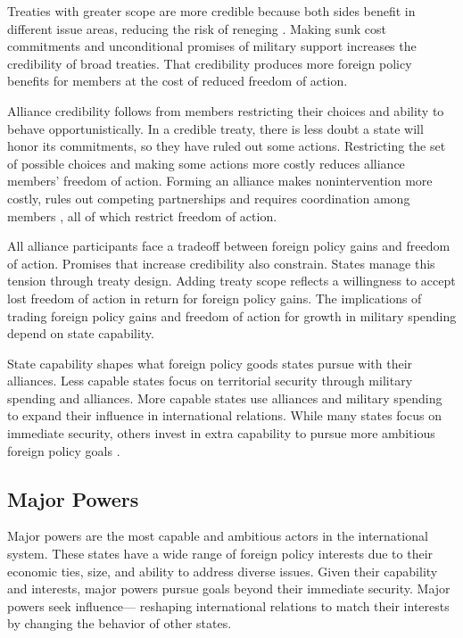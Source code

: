 \documentclass[12pt]{article}
\begin{document}
Treaties with greater scope are more credible because both sides benefit in different issue areas, reducing the risk of reneging \citep{Poast2013}. 
Making sunk cost commitments and unconditional promises of military support increases the credibility of broad treaties.
That credibility produces more foreign policy benefits for members at the cost of reduced freedom of action. 


Alliance credibility follows from members restricting their choices and ability to behave opportunistically. 
In a credible treaty, there is less doubt a state will honor its commitments, so they have ruled out some actions. 
Restricting the set of possible choices and making some actions more costly reduces alliance members' freedom of action. 
Forming an alliance makes nonintervention more costly, rules out competing partnerships and requires coordination among members \citep{Snyder1997}, all of which restrict freedom of action. 


All alliance participants face a tradeoff between foreign policy gains and freedom of action. 
Promises that increase credibility also constrain. 
States manage this tension through treaty design. 
Adding treaty scope reflects a willingness to accept lost freedom of action in return for foreign policy gains. 
The implications of trading foreign policy gains and freedom of action for growth in military spending depend on state capability. 


State capability shapes what foreign policy goods states pursue with their alliances. 
Less capable states focus on territorial security through military spending and alliances. 
More capable states use alliances and military spending to expand their influence in international relations. 
While many states focus on immediate security, others invest in extra capability to pursue more ambitious foreign policy goals \citep{Fordham2011, MarkowitzFariss2017}. 


\subsection{Major Powers} 


Major powers are the most capable and ambitious actors in the international system. 
These states have a wide range of foreign policy interests due to their economic ties, size, and ability to address diverse issues. 
Given their capability and interests, major powers pursue goals beyond their immediate security. 
Major powers seek influence--- reshaping international relations to match their interests by changing the behavior of other states. 
\end{document}
